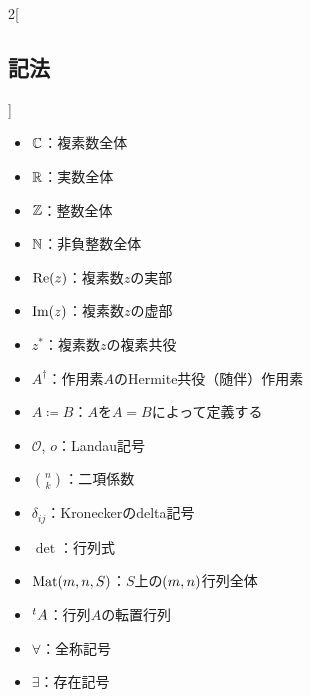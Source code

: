 \documentclass[a4paper,draft]{ltjsbook}
\begin{document}
\columnseprule=0.5pt
\begin{multicols}{2}[\subsection*{記法}]
    \begin{itemize}
        \item $\mathbb{C}$：複素数全体
        \item $\mathbb{R}$：実数全体
        \item $\mathbb{Z}$：整数全体
        \item $\mathbb{N}$：非負整数全体
        \item $\re{z}$：複素数$z$の実部
        \item $\im{z}$：複素数$z$の虚部
        \item $z^*$：複素数$z$の複素共役
        \item $A^\dagger$：作用素$A$のHermite共役（随伴）作用素
        \item $A\coloneqq B$：$A$を$A=B$によって定義する
        \item $\mathcal{O}$, $o$：Landau記号
        \item $\binom{n}{k}$：二項係数
        \item $\delta_{ij}$：Kroneckerのdelta記号
        \item $\det$：行列式
        \item $\Mat{m}{n}{S}$：$S$上の$\pare{m,n}$行列全体
        \item ${}^t{A}$：行列$A$の転置行列
        \item $\forall$：全称記号
        \item $\exists$：存在記号
    \end{itemize}
\end{multicols}
\columnseprule=0.0pt
\end{document}
